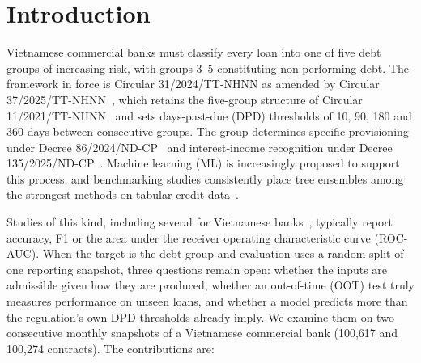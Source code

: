 \documentclass[runningheads]{llncs}
\begin{document}
\section{Introduction}
\label{sec:intro}

Vietnamese commercial banks must classify every loan into one of five debt groups of increasing risk, with groups 3--5 constituting non-performing debt. The framework in force is Circular 31/2024/TT-NHNN as amended by Circular 37/2025/TT-NHNN~\cite{sbv2024tt31}, which retains the five-group structure of Circular 11/2021/TT-NHNN~\cite{sbv2021tt11} and sets days-past-due (DPD) thresholds of 10, 90, 180 and 360 days between consecutive groups. The group determines specific provisioning under Decree 86/2024/ND-CP~\cite{gov2024nd86} and interest-income recognition under Decree 135/2025/ND-CP~\cite{gov2025nd135}. Machine learning (ML) is increasingly proposed to support this process, and benchmarking studies consistently place tree ensembles among the strongest methods on tabular credit data~\cite{lessmann2015benchmarking,brown2012experimental}.

Studies of this kind, including several for Vietnamese banks~\cite{tran2021mlcredit,trung2024credit,nguyen2024ews}, typically report accuracy, F1 or the area under the receiver operating characteristic curve (ROC-AUC). When the target is the debt group and evaluation uses a random split of one reporting snapshot, three questions remain open: whether the inputs are admissible given how they are produced, whether an out-of-time (OOT) test truly measures performance on unseen loans, and whether a model predicts more than the regulation's own DPD thresholds already imply. We examine them on two consecutive monthly snapshots of a Vietnamese commercial bank (100,617 and 100,274 contracts). The contributions are:
\end{document}
